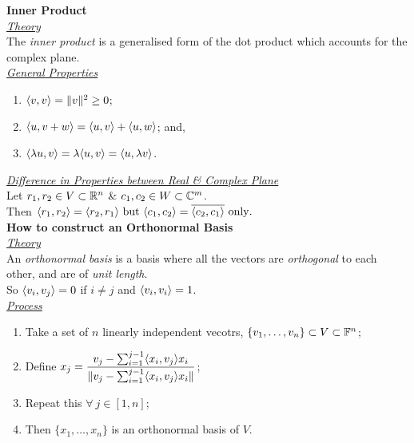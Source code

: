 \documentclass[11pt,a4paper]{article}
\begin{document}
\textbf{Inner Product}\\

\underline{\textit{Theory}}\\
The \textit{inner product} is a generalised form of the dot product which accounts for the complex plane.\\

\newpage\underline{\textit{General Properties}}
\begin{enumerate}[label=\roman*)]
  \itemsep0em
  \item $\langle v, v \rangle = \|v\|^2 \geq 0$;
  \item $\langle u, v + w \rangle = \langle u, v \rangle + \langle u, w \rangle$; and,
  \item $\langle \lambda u, v \rangle = \lambda\langle u, v \rangle = \langle u, \lambda v \rangle$.
\end{enumerate}

\underline{\textit{Difference in Properties between Real \& Complex Plane}}\\
Let $r_1, r_2 \in V \subset \mathbb{R}^n$ \& $c_1, c_2 \in W \subset \mathbb{C}^m$.\\
Then $\langle r_1, r_2 \rangle = \langle r_2, r_1 \rangle \mathrm{\ but\ } \langle c_1, c_2 \rangle = \overline{\langle c_2, c_1 \rangle} \mathrm{\ only.}$\\

\textbf{How to construct an Orthonormal Basis}\\

\underline{\textit{Theory}}\\
An \textit{orthonormal basis} is a basis where all the vectors are \textit{orthogonal} to each other, and are of \textit{unit length}.\\
So $\langle v_i, v_j \rangle = 0$ if $i \neq j$ and $\langle v_i, v_i \rangle = 1$.\\

\underline{\textit{Process}}
\begin{enumerate}[label=\roman*)]
  \itemsep0em
  \item Take a set of $n$ linearly independent vecotrs, $\{v_1, \dots , v_n \} \subset V \subset \mathbb{F}^n$;
  \item Define $\displaystyle{x_j = \frac{v_j - \sum_{i=1}^{j-1} \langle x_i, v_j \rangle x_i}{\|v_j - \sum_{i=1}^{j-1} \langle x_i, v_j \rangle x_i\|}}$;
  \item Repeat this $\forall\ j \in [1, n]$;
  \item Then $\{x_1, \dots, x_n\}$ is an orthonormal basis of $V$.
\end{enumerate}
\end{document}
